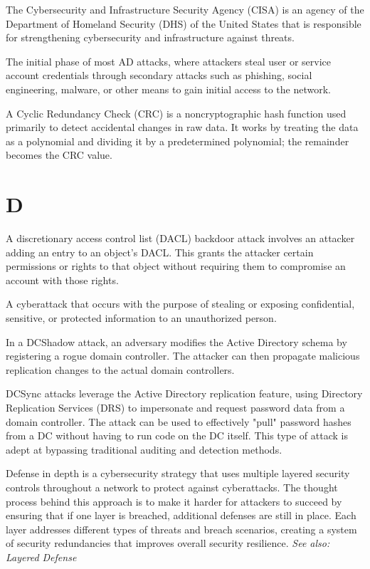  The Cybersecurity and Infrastructure Security Agency (CISA) is an agency of the Department of Homeland Security (DHS) of the United States that is responsible for strengthening cybersecurity and infrastructure against threats.

 The initial phase of most AD attacks, where attackers steal user or service account credentials through secondary attacks such as phishing, social engineering, malware, or other means to gain initial access to the network.

 A Cyclic Redundancy Check (CRC) is a noncryptographic hash function used primarily to detect accidental changes in raw data. It works by treating the data as a polynomial and dividing it by a predetermined polynomial; the remainder becomes the CRC value.

\section{D}
 A discretionary access control list (DACL) backdoor attack involves an attacker adding an entry to an object's DACL. This grants the attacker certain permissions or rights to that object without requiring them to compromise an account with those rights.

 A cyberattack that occurs with the purpose of stealing or exposing confidential, sensitive, or protected information to an unauthorized person.

 In a DCShadow attack, an adversary modifies the Active Directory schema by registering a rogue domain controller. The attacker can then propagate malicious replication changes to the actual domain controllers.

 DCSync attacks leverage the Active Directory replication feature, using Directory Replication Services (DRS) to impersonate and request password data from a domain controller. The attack can be used to effectively "pull" password hashes from a DC without having to run code on the DC itself. This type of attack is adept at bypassing traditional auditing and detection methods.

 Defense in depth is a cybersecurity strategy that uses multiple layered security controls throughout a network to protect against cyberattacks. The thought process behind this approach is to make it harder for attackers to succeed by ensuring that if one layer is breached, additional defenses are still in place. Each layer addresses different types of threats and breach scenarios, creating a system of security redundancies that improves overall security resilience.
\textit{See also: Layered Defense}

